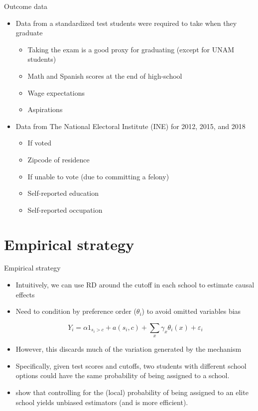 \documentclass[notes,11pt, aspectratio=169]{beamer}
\begin{document}
\begin{frame}{Outcome data}
  \begin{itemize}
    \vfill\item Data from a standardized test students were required to take when they graduate
  \begin{itemize}
  \vfill\item Taking the exam is a good proxy for graduating (except for UNAM students)
    \vfill\item Math and Spanish scores at the end of high-school
    \vfill\item Wage expectations
    \vfill\item Aspirations
      \end{itemize}

    \vfill\item Data from The National Electoral Institute (INE) for 2012, 2015, and 2018
      \begin{itemize}
    \vfill\item If voted 
    \vfill\item Zipcode of residence 
    \vfill\item If unable to vote (due to committing a felony)
    \vfill\item Self-reported education
    \vfill\item Self-reported occupation
      \end{itemize}
  \end{itemize}
\end{frame}

\section{Empirical strategy}

\begin{frame}{Empirical strategy}
  \begin{itemize}
     \vfill\item Intuitively, we can use RD around the cutoff in each school to estimate causal effects
     \vfill\item Need to condition by preference order ($\theta_i$) to avoid omitted variables
bias

$$Y_i=\alpha 1_{s_i>c}+a(s_i,c)+\sum_{x}\gamma_{x}\theta_{i}(x)+\varepsilon_i $$
\pause

\vfill\item However, this discards much of the variation generated by the mechanism
     \vfill\item Specifically, given test scores and cutoffs, two students with different school options could have the same probability of being assigned to a school.
\vfill\item \citet{abdulkadirouglu2022breaking} show that controlling for the (local) probability of being assigned to an elite school yields unbiased estimators (and is more efficient).
  \end{itemize}
\end{frame}
\end{document}
